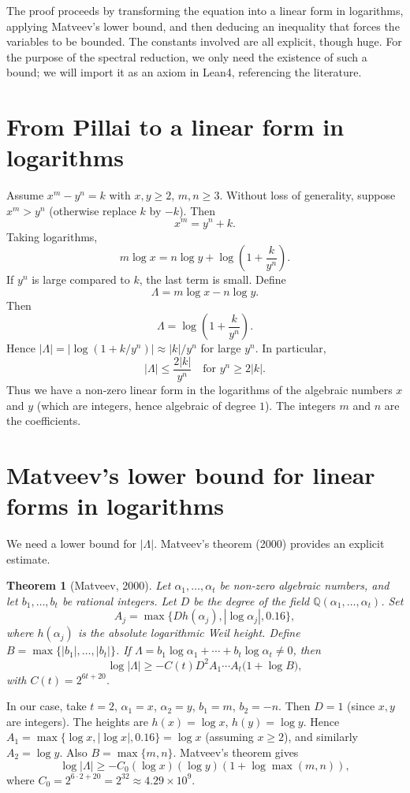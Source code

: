 \documentclass[11pt,a4paper]{article}
\newtheorem{theorem}{Theorem}[section]
\begin{document}
The proof proceeds by transforming the equation into a linear form in logarithms, applying Matveev's lower bound, and then deducing an inequality that forces the variables to be bounded. The constants involved are all explicit, though huge. For the purpose of the spectral reduction, we only need the existence of such a bound; we will import it as an axiom in Lean4, referencing the literature.

\section{From Pillai to a linear form in logarithms}

Assume $x^m - y^n = k$ with $x,y \ge 2$, $m,n \ge 3$. Without loss of generality, suppose $x^m > y^n$ (otherwise replace $k$ by $-k$). Then
\[
x^m = y^n + k.
\]
Taking logarithms,
\[
m \log x = n \log y + \log\!\left(1 + \frac{k}{y^n}\right).
\]
If $y^n$ is large compared to $k$, the last term is small. Define
\[
\Lambda = m \log x - n \log y.
\]
Then
\[
\Lambda = \log\!\left(1 + \frac{k}{y^n}\right).
\]
Hence $|\Lambda| = |\log(1 + k/y^n)| \approx |k|/y^n$ for large $y^n$. In particular,
\[
|\Lambda| \le \frac{2|k|}{y^n} \quad\text{for } y^n \ge 2|k|.
\]
Thus we have a non‑zero linear form in the logarithms of the algebraic numbers $x$ and $y$ (which are integers, hence algebraic of degree $1$). The integers $m$ and $n$ are the coefficients.

\section{Matveev's lower bound for linear forms in logarithms}

We need a lower bound for $|\Lambda|$. Matveev's theorem (2000) provides an explicit estimate.

\begin{theorem}[Matveev, 2000]\label{thm:matveev}
Let $\alpha_1,\dots,\alpha_t$ be non‑zero algebraic numbers, and let $b_1,\dots,b_t$ be rational integers. Let $D$ be the degree of the field $\mathbb{Q}(\alpha_1,\dots,\alpha_t)$. Set
\[
A_j = \max\{D h(\alpha_j), |\log \alpha_j|, 0.16\},
\]
where $h(\alpha_j)$ is the absolute logarithmic Weil height. Define $B = \max\{|b_1|,\dots,|b_t|\}$. If $\Lambda = b_1\log\alpha_1 + \cdots + b_t\log\alpha_t \neq 0$, then
\[
\log|\Lambda| \ge -C(t) D^2 A_1\cdots A_t \bigl(1 + \log B\bigr),
\]
with $C(t) = 2^{6t+20}$.
\end{theorem}

In our case, take $t=2$, $\alpha_1 = x$, $\alpha_2 = y$, $b_1 = m$, $b_2 = -n$. Then $D=1$ (since $x,y$ are integers). The heights are $h(x) = \log x$, $h(y) = \log y$. Hence $A_1 = \max\{\log x, |\log x|, 0.16\} = \log x$ (assuming $x\ge 2$), and similarly $A_2 = \log y$. Also $B = \max\{m,n\}$. Matveev's theorem gives
\[
\log|\Lambda| \ge -C_0 (\log x)(\log y) (1 + \log\max(m,n)),
\]
where $C_0 = 2^{6\cdot2+20} = 2^{32} \approx 4.29\times10^9$.
\end{document}
